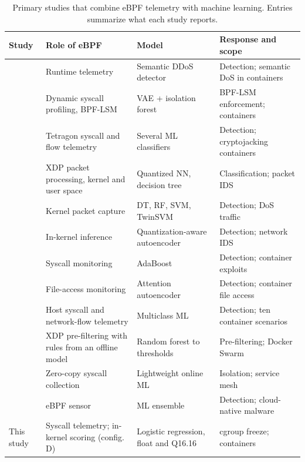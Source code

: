 \begin{table}[t]
\centering
\caption{Primary studies that combine eBPF telemetry with machine learning. Entries summarize what each study reports.}
\label{tab:related}
\footnotesize
\renewcommand{\arraystretch}{1.08}
\begin{tabularx}{\textwidth}{@{}>{\raggedright\arraybackslash}p{} >{\raggedright\arraybackslash}X >{\raggedright\arraybackslash}X >{\raggedright\arraybackslash}X@{}}
\toprule
Study & Role of eBPF & Model & Response and scope \\
\midrule
\textcite{P003} & Runtime telemetry & Semantic DDoS detector & Detection; semantic DoS in containers \\
\textcite{P005} & Dynamic syscall profiling, BPF-LSM & VAE + isolation forest & BPF-LSM enforcement; containers \\
\textcite{P006} & Tetragon syscall and flow telemetry & Several ML classifiers & Detection; cryptojacking containers \\
\textcite{P012} & XDP packet processing, kernel and user space & Quantized NN, decision tree & Classification; packet IDS \\
\textcite{P013} & Kernel packet capture & DT, RF, SVM, TwinSVM & Detection; DoS traffic \\
\textcite{P014} & In-kernel inference & Quantization-aware autoencoder & Detection; network IDS \\
\textcite{P016} & Syscall monitoring & AdaBoost & Detection; container exploits \\
\textcite{P017} & File-access monitoring & Attention autoencoder & Detection; container file access \\
\textcite{P018} & Host syscall and network-flow telemetry & Multiclass ML & Detection; ten container scenarios \\
\textcite{P031} & XDP pre-filtering with rules from an offline model & Random forest to thresholds & Pre-filtering; Docker Swarm \\
\textcite{P034} & Zero-copy syscall collection & Lightweight online ML & Isolation; service mesh \\
\textcite{P038} & eBPF sensor & ML ensemble & Detection; cloud-native malware \\
\midrule
This study & Syscall telemetry; in-kernel scoring (config. D) & Logistic regression, float and Q16.16 & cgroup freeze; containers \\
\bottomrule
\end{tabularx}
\end{table}
